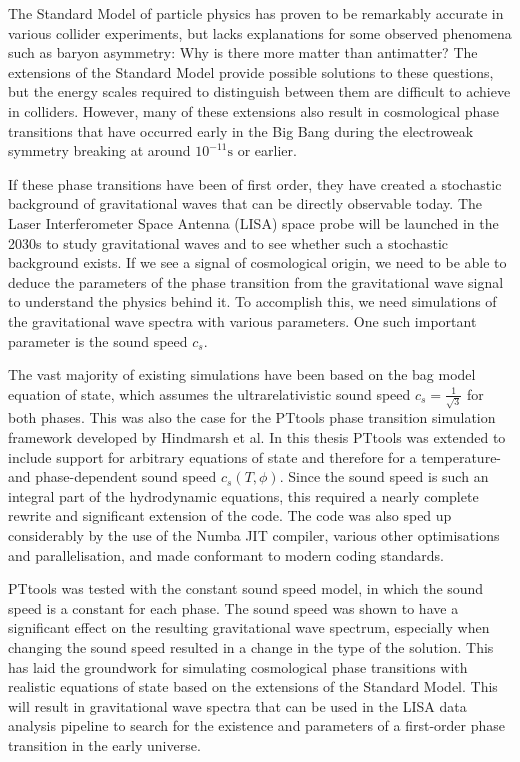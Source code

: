 The Standard Model of particle physics has proven to be remarkably accurate in various collider experiments,
but lacks explanations for some observed phenomena such as baryon asymmetry: Why is there more matter than antimatter?
The extensions of the Standard Model provide possible solutions to these questions,
but the energy scales required to distinguish between them are difficult to achieve in colliders.
However, many of these extensions also result in cosmological phase transitions that have occurred early in the Big Bang during the electroweak symmetry breaking at around $10^{-11} \text{s}$ or earlier.

If these phase transitions have been of first order,
they have created a stochastic background of gravitational waves that can be directly observable today.
The Laser Interferometer Space Antenna (LISA) space probe will be launched in the 2030s to study gravitational waves and
to see whether such a stochastic background exists.
If we see a signal of cosmological origin,
we need to be able to deduce the parameters of the phase transition from the gravitational wave signal to understand the physics behind it.
To accomplish this, we need simulations of the gravitational wave spectra with various parameters.
One such important parameter is the sound speed $c_s$.

The vast majority of existing simulations have been based on the bag model equation of state,
which assumes the ultrarelativistic sound speed $c_s =\frac{1}{\sqrt{3}}$ for both phases.
This was also the case for the PTtools phase transition simulation framework developed by Hindmarsh et al.
In this thesis PTtools was extended to include support for arbitrary equations of state and therefore for a temperature- and phase-dependent sound speed $c_s(T,\phi)$.
Since the sound speed is such an integral part of the hydrodynamic equations,
this required a nearly complete rewrite and significant extension of the code.
The code was also sped up considerably by the use of the Numba JIT compiler, various other optimisations and parallelisation,
and made conformant to modern coding standards.

PTtools was tested with the constant sound speed model, in which the sound speed is a constant for each phase.
The sound speed was shown to have a significant effect on the resulting gravitational wave spectrum,
especially when changing the sound speed resulted in a change in the type of the solution.
This has laid the groundwork for simulating cosmological phase transitions with realistic equations of state based on the extensions of the Standard Model.
This will result in gravitational wave spectra that can be used in the LISA data analysis pipeline to search for the existence and parameters of a first-order phase transition in the early universe.



